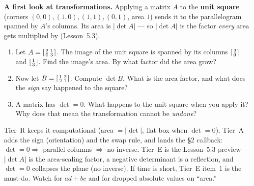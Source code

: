 \documentclass[10pt]{article}
\begin{document}
\begin{tcolorbox}[colback=white, colframe=black!40, title=\textbf{Tier E --- Extension},
    fonttitle=\bfseries, arc=1.5mm, left=3mm, right=3mm, top=2mm, bottom=2mm, breakable]
\textbf{A first look at transformations.} Applying a matrix $A$ to the \textbf{unit square} (corners
$(0,0),(1,0),(1,1),(0,1)$, area $1$) sends it to the parallelogram spanned by $A$'s columns. Its area
is $|\det A|$ --- so $|\det A|$ is the factor \emph{every} area gets multiplied by (Lesson~5.3).
\begin{enumerate}[leftmargin=1.7em, itemsep=9pt]
  \item Let $A=\begin{bsmallmatrix} 2 & 1\\ 0 & 3 \end{bsmallmatrix}$. The image of the unit square is
        spanned by its columns $\begin{bsmallmatrix} 2\\0 \end{bsmallmatrix}$ and
        $\begin{bsmallmatrix} 1\\3 \end{bsmallmatrix}$. Find the image's area. By what factor did the
        area grow?
  \item Now let $B=\begin{bsmallmatrix} 1 & 2\\ 2 & 1 \end{bsmallmatrix}$. Compute $\det B$. What is the
        area factor, and what does the \emph{sign} say happened to the square?
  \item A matrix has $\det=0$. What happens to the unit square when you apply it? Why does that mean
        the transformation cannot be \emph{undone}?
\end{enumerate}
\end{tcolorbox}

\begin{teachernote}
Tier~R keeps it computational (area $=|\det|$, flat box when $\det=0$). Tier~A adds the sign
(orientation) and the swap rule, and lands the §2 callback: $\det=0\Rightarrow$ parallel columns
$\Rightarrow$ no inverse. Tier~E is the Lesson~5.3 preview --- $|\det A|$ is the area-scaling factor,
a negative determinant is a reflection, and $\det=0$ collapses the plane (no inverse). If time is
short, Tier~E item~1 is the must-do. Watch for $ad+bc$ and for dropped absolute values on ``area.''
\end{teachernote}
\end{document}
